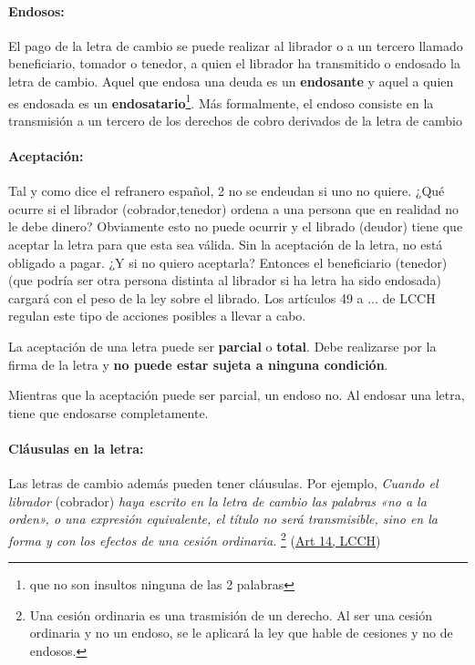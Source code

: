 \documentclass[nochap,palatino,shortheader]{apuntes}
\newcommand{\study}[1]{#1} \newcommand{\substudy}[1]{#1}
\begin{document}
\paragraph{Endosos: }
El pago de la letra de cambio se puede realizar al librador o a un tercero llamado beneficiario, \substudy{tomador o tenedor}, a quien el librador ha transmitido o endosado la letra de cambio.
Aquel que endosa una deuda es un \textbf{endosante} y aquel a quien es endosada es un \textbf{endosatario}\footnote{que no son insultos ninguna de las 2 palabras}. Más formalmente, \substudy{el endoso consiste en la transmisión a un tercero de los derechos de cobro derivados de la letra de cambio}


\paragraph{Aceptación: }Tal y como dice el refranero español, 2 no se endeudan si uno no quiere. ¿Qué ocurre si el librador (cobrador,tenedor) ordena a una persona que en realidad no le debe dinero? Obviamente esto no puede ocurrir y el librado (deudor) tiene que aceptar la letra para que esta sea válida.
Sin la aceptación de la letra, no está obligado a pagar. ¿Y si no quiero aceptarla? Entonces el beneficiario (tenedor) (que podría ser otra persona distinta al librador si ha letra ha sido endosada) cargará con el peso de la ley sobre el librado. Los artículos 49 a ... de LCCH regulan este tipo de acciones posibles a llevar a cabo.


La \study{aceptación} de una letra puede ser \substudy{\textbf{parcial}} o \substudy{\textbf{total}}.
Debe realizarse por \substudy{la firma de la letra} y \study{\textbf{no puede estar sujeta a ninguna condición}}.

Mientras que la \study{aceptación} puede ser \substudy{parcial}, un endoso no. Al \study{endosar} una letra, tiene que endosarse \substudy{completamente}.

\paragraph{Cláusulas en la letra: } Las letras de cambio además pueden tener cláusulas. Por ejemplo, \textit{Cuando el librador} (cobrador) \textit{haya escrito en la letra de cambio las palabras \study{«no a la orden»}, o una expresión equivalente, \substudy{el título no será transmisible}, \substudy{sino} en la forma y con los efectos de una \substudy{cesión ordinaria}.}
\footnote{Una cesión ordinaria es una trasmisión de un derecho. Al ser una cesión ordinaria y no un endoso, se le aplicará la ley que hable de cesiones y no de endosos.} (\href{https://www.boe.es/buscar/act.php?id=BOE-A-1985-14880&p=20150703&tn=1#acatorce}{Art 14, LCCH})
\end{document}

